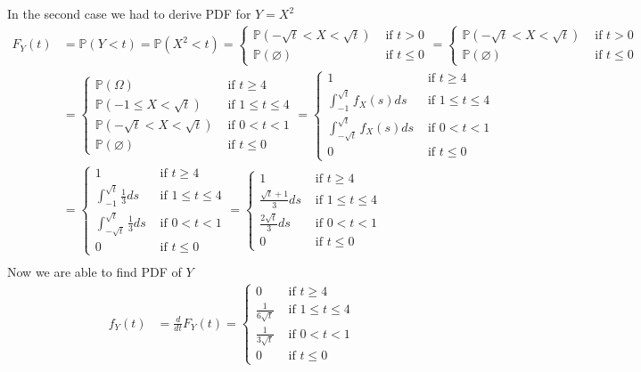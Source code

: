 \documentclass[10pt]{article}
\begin{document}
In the second case we had to derive PDF for $Y=X^2$
\begin{align}
F_Y(t)
&=\mathbb{P}(Y<t)
=\mathbb{P}(X^2<t)
=\begin{cases}
\mathbb{P}(-\sqrt{t}<X<\sqrt{t}) & \mbox { if } t>0\\
\mathbb{P}(\varnothing) & \mbox { if } t\leq 0
\end{cases}
=\begin{cases}
\mathbb{P}(-\sqrt{t}<X<\sqrt{t}) & \mbox { if } t>0\\
\mathbb{P}(\varnothing) & \mbox { if } t\leq 0
\end{cases}\\
&=\begin{cases}
\mathbb{P}(\Omega) & \mbox { if } t\geq 4\\
\mathbb{P}(-1\leq X<\sqrt{t})  & \mbox { if } 1\leq t\leq 4\\
\mathbb{P}(-\sqrt{t}<X<\sqrt{t}) & \mbox { if } 0<t<1\\
\mathbb{P}(\varnothing) & \mbox { if } t\leq 0
\end{cases}
=\begin{cases}
1 & \mbox { if } t\geq 4\\
\int_{-1}^{\sqrt{t}} f_X(s)ds  & \mbox { if } 1\leq t\leq 4\\
\int_{-\sqrt{t}}^{\sqrt{t}}f_X(s)ds & \mbox { if } 0<t<1\\
0 & \mbox { if } t\leq 0
\end{cases}\\
&=\begin{cases}
1 & \mbox { if } t\geq 4\\
\int_{-1}^{\sqrt{t}} \frac{1}{3}ds  & \mbox { if } 1\leq t\leq 4\\
\int_{-\sqrt{t}}^{\sqrt{t}}\frac{1}{3}ds & \mbox { if } 0<t<1\\
0 & \mbox { if } t\leq 0
\end{cases}
=\begin{cases}
1 & \mbox { if } t\geq 4\\
\frac{\sqrt{t}+1}{3}ds  & \mbox { if } 1\leq t\leq 4\\
\frac{2\sqrt{t}}{3}ds & \mbox { if } 0<t<1\\
0 & \mbox { if } t\leq 0
\end{cases}\\
\end{align}
Now we are able to find PDF of $Y$
\begin{align}
f_Y(t)
&=\frac{d}{dt} F_Y(t)
=\begin{cases}
0 & \mbox { if } t\geq 4\\
\frac{1}{6\sqrt{t}}  & \mbox { if } 1\leq t\leq 4\\
\frac{1}{3\sqrt{t}} & \mbox { if } 0<t<1\\
0 & \mbox { if } t\leq 0
\end{cases}\\
\end{align}
\end{document}
